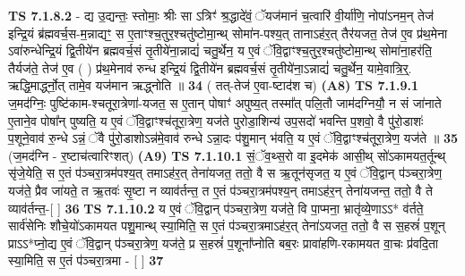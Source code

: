 \documentclass[17pt]{extarticle}
\begin{document}
                  \newline
                                \textbf{ TS 7.1.8.2} \newline
                  - द्य उ॒द्यन्तः॒ स्तोमाः॒ श्रीः सा ऽत्रिꣳ॑ श्र॒द्धादे॑वं॒ ॅयज॑मानं च॒त्वारि॑ वी॒र्या॑णि॒ नोपा॑ऽनम॒न् तेज॑ इन्द्रि॒यं ब्र॑ह्मवर्च॒स-म॒न्नाद्यꣳ॒॒ स ए॒ताꣳश्च॒तुर॒श्चतु॑ष्टोमा॒न्थ् सोमा॑न-पश्य॒त् तानाऽह॑र॒त् तैर॑यजत॒ तेज॑ ए॒व प्र॑थ॒मेना ऽवा॑रुन्धेन्द्रि॒यं द्वि॒तीये॑न ब्रह्मवर्च॒सं तृ॒तीये॑ना॒न्नाद्यं॑ चतु॒र्थेन॒ य ए॒वं ॅवि॒द्वाꣳश्च॒तुर॒श्चतु॑ष्टोमा॒न्थ् सोमा॑ना॒हर॑ति॒ तैर्यज॑ते॒ तेज॑ ए॒व ( ) प्र॑थ॒मेनाव॑ रुन्ध इन्द्रि॒यं द्वि॒तीये॑न ब्रह्मवर्च॒सं तृ॒तीये॑ना॒ऽन्नाद्यं॑ चतु॒र्थेन॒ यामे॒वात्रि॒र्॒. ऋद्धि॒मार्द्ध्नो॒त् तामे॒व यज॑मान ऋद्ध्नोति ॥ \textbf{  34} \newline
                  \newline
                      ( तत्-तेज॑ ए॒वा-ष्टाद॑श च)  \textbf{(A8)} \newline \newline
                                        \textbf{ TS 7.1.9.1} \newline
                  ज॒मद॑ग्निः॒ पुष्टि॑काम-श्चतूरा॒त्रेणा॑-यजत॒ स ए॒तान् पोषाꣳ॑ अपुष्य॒त् तस्मा᳚त् पलि॒तौ जाम॑दग्नियौ॒ न सं जा॑नाते ए॒ताने॒व पोषा᳚न् पुष्यति॒ य ए॒वं ॅवि॒द्वाꣳश्च॑तूरा॒त्रेण॒ यज॑ते पुरोडा॒शिन्य॑ उप॒सदो॑ भवन्ति प॒शवो॒ वै पु॑रो॒डाशः॑ प॒शूने॒वाव॑ रु॒न्धे ऽन्नं॒ ॅवै पु॑रो॒डाशोऽन्न॑मे॒वाव॑ रुन्धे ऽन्ना॒दः प॑शु॒मान् भ॑वति॒ य ए॒वं ॅवि॒द्वाꣳश्च॑तूरा॒त्रेण॒ यज॑ते ॥ \textbf{  35} \newline
                  \newline
                      (ज॒मद॑ग्नि - र॒ष्टाच॑त्वारिꣳशत्)  \textbf{(A9)} \newline \newline
                                        \textbf{ TS 7.1.10.1} \newline
                  सं॒ॅव॒थ्स॒रो वा इ॒दमेक॑ आसी॒थ् सो॑ऽकामयत॒र्तून्थ् सृ॑जे॒येति॒ स ए॒तं प॑ञ्चरा॒त्रम॑पश्य॒त् तमाऽह॑र॒त् तेना॑यजत॒ ततो॒ वै स ऋ॒तून॑सृजत॒ य ए॒वं ॅवि॒द्वान् प॑ञ्चरा॒त्रेण॒ यज॑ते॒ प्रैव जा॑यते॒ त ऋ॒तवः॑ सृ॒ष्टा न व्याव॑र्तन्त॒ त ए॒तं प॑ञ्चरा॒त्रम॑पश्य॒न् तमाऽह॑र॒न् तेना॑यजन्त॒ ततो॒ वै ते व्याव॑र्तन्त॒-[  ] \textbf{  36} \newline
                  \newline
                                \textbf{ TS 7.1.10.2} \newline
                  य ए॒वं ॅवि॒द्वान् प॑ञ्चरा॒त्रेण॒ यज॑ते॒ वि पा॒प्मना॒ भ्रातृ॑व्ये॒णाऽऽ* व॑र्तते॒ सार्व॑सेनिः शौचे॒यो॑ऽकामयत पशु॒मान्थ् स्या॒मिति॒ स ए॒तं प॑ञ्चरा॒त्रमाऽह॑र॒त् तेना॑ऽयजत॒ ततो॒ वै स स॒हस्रं॑ प॒शून् प्राऽऽ*प्नो॒द्य ए॒वं ॅवि॒द्वान् प॑ञ्चरा॒त्रेण॒ यज॑ते॒ प्र स॒हस्रं॑ प॒शूना᳚प्नोति बब॒रः प्रावा॑हणि-रकामयत वा॒चः प्र॑वदि॒ता स्या॒मिति॒ स ए॒तं प॑ञ्चरा॒त्रमा - [  ] \textbf{  37} \newline
\end{document}
